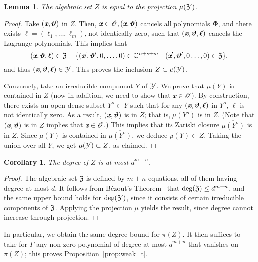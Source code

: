 \documentclass[a4paper]{article}
\def\sO{\mathscr{O}}
\def\thetab{\bm{\vartheta}}
\def\xb{\textit{\textbf{x}}}
\def\dt{s}
\def\C{\mathbb{C}}
\newtheorem{corollary}[theorem]{Corollary}
\newtheorem{lemma}[theorem]{Lemma}
\begin{document}
    \begin{lemma}  
      The algebraic set $Z$ is equal to the projection $\mu(\frak{Z}')$.
    \end{lemma}
    \begin{proof}
      Take $(\xb,\thetab)$ in $Z$. Then, $\xb \in \sO, (\xb,\thetab)$ cancels all
      polynomials $\bm \Phi$, and there exists $\bm
      \ell=(\ell_1,\dots,\ell_m)$, not identically zero, such that
      $(\xb,\thetab,\bm \ell)$ cancels the Lagrange polynomials. This
      implies that 
      \[
      (\xb,\thetab,\bm \ell) \in\frak{Z} -
      \{(\xb',\thetab',0,\hdots,0) \in
      \C^{n+\dt+m}~|~(\xb',\thetab',0\hdots,0) \in
      \frak{Z}\}, 
      \]
      and thus $(\xb,\thetab,\bm \ell) \in\frak{Z}'$. This proves the inclusion
      $Z \subset \mu(\frak{Z}')$.
    
      Conversely, take an irreducible component $Y$ of $\frak Z'$. We
      prove that $\mu(Y)$ is contained in $Z$ (now in addition, we need to show that $\xb \in \sO$).  By construction, there
      exists an open dense subset $Y^o \subset Y$ such that for any
      $(\xb,\thetab,\bm \ell)$ in $Y^o$, $\bm \ell$ is not identically
      zero. As a result, $(\xb,\thetab)$ is in $Z$; that is, $\mu(Y^o)$ is
      in $Z$. (Note that $(\xb,\thetab)$ is in $Z$ implies that $\xb \in \sO$.) This implies that its Zariski closure $\overline{\mu(Y^o)}$
      is in $Z$. Since $\mu(Y)$ is contained in $\overline{\mu(Y^o)}$, we
      deduce $\mu(Y) \subset Z$. Taking the union over all $Y$, we get
      $\mu(\frak Z') \subset Z$, as claimed.
    \end{proof} 
    
    
    \begin{corollary} 
      The degree of $Z$ is at most $d^{m+n}.$
    \end{corollary}
    \begin{proof}
      The algebraic set $\frak Z$ is defined by $m+n$ equations, all of
      them having degree at most $d$. It follows from B\'ezout's
      Theorem~\cite{H} that $\deg(\frak{Z}) \leq d^{m+n}$, and the same
      upper bound holds for $\deg(\frak{Z}')$, since it consists of
      certain irreducible components of $\frak Z$. Applying the projection
      $\mu$ yields the result, since degree cannot increase through
      projection.
    \end{proof}

    In particular, we obtain the same degree bound for
    $\overline{\pi(Z)}$.  It then suffices to take for $\Gamma$ any
    non-zero polynomial of degree at most $d^{m+n}$ that vanishes on
    $\overline{\pi(Z)}$; this proves Proposition~\ref{prop:weak_t}.
\end{document}

